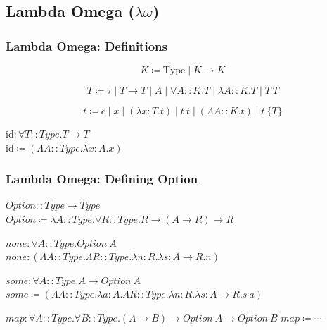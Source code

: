 \documentclass{beamer}
\newcommand{\type}{\text{Type}}
\begin{document}
\subsection{Lambda Omega ($\lambda \omega$)}

\begin{frame}[fragile]
  \frametitle{Lambda Omega: Definitions}

  $$ K \coloneqq \type \mid K \rightarrow K $$

  $$ T \coloneqq \tau \mid T \rightarrow T \mid A \mid \forall A :: K . T \mid \lambda A :: K . T \mid T\ T $$

  $$
    t \coloneqq c
      \mid x
      \mid (\lambda x : T . t)
      \mid t\ t
      \mid (\Lambda A :: K . t)
      \mid t\ \{T\}
  $$

  \vspace{5mm}

  $\text{id} : \forall T :: Type . T \rightarrow T$ \\
  $\text{id} \coloneqq (\Lambda A :: Type . \lambda x : A . x)$ \\
\end{frame}

\begin{frame}[fragile]
  \frametitle{Lambda Omega: Defining Option}

  $Option :: Type \rightarrow Type$ \\
  $Option \coloneqq \lambda A :: Type . \forall R :: Type . R \rightarrow (A \rightarrow R) \rightarrow R$ \\

  \vspace{5mm}

  $none : \forall A :: Type . Option\ A$ \\
  $none : (\Lambda A :: Type . \Lambda R :: Type . \lambda n : R . \lambda s : A \rightarrow R . n)$

  \vspace{5mm}

  $some : \forall A :: Type . A \rightarrow Option\ A$
  $some \coloneqq (\Lambda A :: Type . \lambda a:A . \Lambda R :: Type . \lambda n : R . \lambda s : A\rightarrow R . s\ a)$

  \vspace{5mm}

  $map : \forall A :: Type . \forall B :: Type . (A \rightarrow B) \rightarrow Option\ A \rightarrow Option\ B$
  $map \coloneqq \cdots $

\end{frame}
\end{document}
